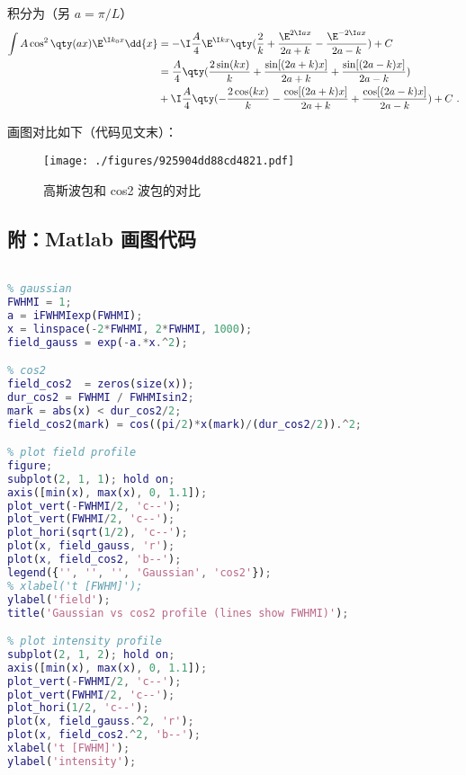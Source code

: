 积分为（另 $a = \pi/L$）
\begin{equation}\label{eq_GausPk_2} %
\begin{aligned}
\int A\cos^2\qty(a x) \E^{\I k_0x} \dd{x} &= -\I\frac{A}{4}\E^{\I kx}\qty(\frac{2}{k} +\frac{\E^{2\I ax}}{2a+k} -\frac{\E^{-2\I ax}}{2a-k}) + C\\
&= \frac{A}{4} \qty(\frac{2\sin(k x)}{k} +\frac{\sin[(2 a+k)x]}{2 a+k} +\frac{\sin[(2 a-k)x]}{2 a-k})\\
&+\I\frac{A}{4} \qty(-\frac{2\cos(k x)}{k} -\frac{\cos[(2 a+k)x]}{2 a+k} +\frac{\cos[(2 a-k)x]}{2 a-k}) + C~.
\end{aligned}
\end{equation}

画图对比如下（代码见文末）：
\begin{figure}[ht]
\centering
\texttt{[image: ./figures/925904dd88cd4821.pdf]}
\caption{高斯波包和 cos2 波包的对比} \label{fig_GausPk_2}
\end{figure}

\subsection{附：Matlab 画图代码}
\begin{lstlisting}[language=matlab, caption=sin2\_gaussian\_compare.m]
% plot Gaussian vs cos2 profile

% gaussian
FWHMI = 1;
a = iFWHMIexp(FWHMI);
x = linspace(-2*FWHMI, 2*FWHMI, 1000);
field_gauss = exp(-a.*x.^2);

% cos2
field_cos2  = zeros(size(x));
dur_cos2 = FWHMI / FWHMIsin2;
mark = abs(x) < dur_cos2/2;
field_cos2(mark) = cos((pi/2)*x(mark)/(dur_cos2/2)).^2;

% plot field profile
figure;
subplot(2, 1, 1); hold on;
axis([min(x), max(x), 0, 1.1]);
plot_vert(-FWHMI/2, 'c--');
plot_vert(FWHMI/2, 'c--');
plot_hori(sqrt(1/2), 'c--');
plot(x, field_gauss, 'r');
plot(x, field_cos2, 'b--');
legend({'', '', '', 'Gaussian', 'cos2'});
% xlabel('t [FWHM]');
ylabel('field');
title('Gaussian vs cos2 profile (lines show FWHMI)');

% plot intensity profile
subplot(2, 1, 2); hold on;
axis([min(x), max(x), 0, 1.1]);
plot_vert(-FWHMI/2, 'c--');
plot_vert(FWHMI/2, 'c--');
plot_hori(1/2, 'c--');
plot(x, field_gauss.^2, 'r');
plot(x, field_cos2.^2, 'b--');
xlabel('t [FWHM]');
ylabel('intensity');
\end{lstlisting}

